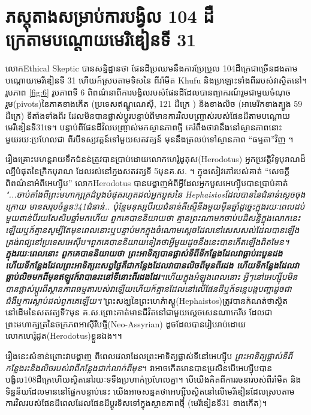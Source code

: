 \documentclass[10pt,twocolumn,letterpaper]{article}
\begin{document}
\section{ភស្តុតាងសម្រាប់ការបង្វិល 104 ដឺក្រេតាមបណ្តោយមេរិឌៀនទី 31}

លោកEthical Skeptic បានសន្និដ្ឋានថា ផែនដីប្រឈមនឹងការប្រែប្រួល 104ដឺក្រេជាច្រើនដង​តាមបណ្តោយមេរីឌៀនទី 31 ហើយក៍ស្របតាមទិសនៃ 
ពីរ៉ាមីត Khufu និងប្រឡោះទាំងពីររបស់វាស្ថិតនៅ។ រូបភាព \ref{fig:6} រូបភាពទី 6 ពិពណ៌នាពីការបង្វិលរបស់ផែនដីដែលបានព្យាករណ៍រួមជាមួយចំណុចរួម(pivots)នៃភាគខាងកើត (ប្រទេស​ឥណ្ឌូណេស៊ី, 121 ដឺក្រេ 
) និងខាងលិច (អាមេរិកខាងត្បូង 59 ដឺក្រេ)  ទីតាំងទាំងពីរ 
ដែលមិនបានផ្លាស់ប្តូរបន្ទាប់ពីមានការវិលបញ្ច្រាស់របស់ផែនដីតាមបណ្តោយមេរីឌៀនទី31ទេ។ បន្ទាប់ពីផែនដីវិលបញ្ច្រាស់មកស្ថានភាពថ្មី គេរំពឹងថាវានឹងនៅស្ថានភាពនោះមួយរយៈប្រហែលជា ពីរ​បីទស្សវត្តន៍ទៅមួយសតវត្សន៍ មុននឹងត្រលប់ទៅស្ថានភាព “ធម្មតា”វិញ \cite{150}។

រឿងគ្រោះមហន្តរាយទឹកជំនន់ត្រូវបានប្រាប់ដោយលោកហេរ៉ូដូតុស(Herodotus) អ្នកប្រវត្តិវិទូបុរាណដ៏ល្បីបំផុតនៃក្រិកបុរាណ ដែលរស់នៅក្នងសតវត្សទី 5​មុនគ.ស. \cite{31}។ ក្នុងសៀវភៅរបស់គាត់ “សេចក្តីពិពណ៌នាអំពីអេហ្ស៊ីប” លោកHerodotus បានបង្ហាញអំពីអ្វីដែលអ្នកបួសអេហ្ស៊ីបបានប្រាប់គាត់ \textit{"...ចាប់តាំងពីព្រះមហាក្សត្រដំបូងបំផុតរហូតដល់អ្នកបួសនៃ Hephaistosដែលបាននៃជំនាន់ស្តេចចុងក្រោយ មានសរុបចំនួន341ជំនាន់.. ប៉ុន្តែមនុស្សបីរយជំនាន់គឺស្មើនឹងមួយម៉ឺនឆ្នាំ​ដូច្នេះក្នុងរយៈពេលដប់មួយពាន់បីរយសែសិបឆ្នាំមកហើយ ពួកគេបាននិយាយថា គ្មានព្រះណាមកចាប់បដិសន្ធិក្នុងលោកនេះឡើយ​ឬក៍គ្មានសូម្បីតែមុនពេលនោះឬបន្ទាប់មកក្នុងចំណោមស្ដេចដែលនៅសេសសល់ដែលបានឡើងគ្រង់រាជ្យនៅប្រទេសអេស៊ីប។ពួកគេបាននិយាយទៀតថាអ្វីមួយដូចនឹងនេះបានកើតឡើងពិតមែន។\textbf{ក្នុងរយៈពេលនោះ ពួកគេបាននិយាយថា ព្រះអាទិត្យបានផ្លាស់ទីពីទីកន្លែងដែលវាធ្លាប់រះបួនដង ហើយទីកន្លែងដែលព្រះអាទិត្យរះសព្វថ្ងៃគឺជាកន្លែងដែលវាបានលិចពីមុនពីរដង ហើយទីកន្លែងដែលវាធ្លាប់លិចមកពីមុនឥឡូវក៍វាបានរះនៅទីនោះពីរដងដែរ}។​ហើយក្នុងអំឡុងពេលនោះ អ្វីៗនៅអេហ្ស៊ីបមិនបានផ្លាស់ប្ដូរពីស្ថានភាពធម្មតារបស់វាឡើយ​ហើយក៍គ្មានដែលនៅលើផែនដីឬក៍ទន្លេបង្កបញ្ហាដូចជាជំងឺឬការស្លាប់ដល់ពួកគេឡើយ។"}\cite{32}ព្រះសង្ឃនៃព្រះហេភ៉ាស្តូ(Hephaistos)ត្រូវបានកំណត់ថាស្ថិតនៅដើមនៃសតវត្សទី7មុន គ.ស.ព្រោះគាត់មានជីវិតនៅជាមួយស្តេចសេនណាកេរីប ដែលជាព្រះមហាក្សត្រនៃចក្រភពអាស៊ីរីបថ្មី(Neo-Assyrian) ដូចដែលបានរៀបរាប់ដោយលោកហេរ៉ូដូត(Herodotus)ខ្លួនឯង។\cite{32,33,34}។

រឿងនេះសំខាន់ព្រោះវាបង្ហាញ ពីពេលវេលាដែលព្រះអាទិត្យផ្លាស់ទីនៅអេហ្ស៊ីប \textit{ព្រះអាទិត្យផ្លាស់ទីពីកន្លែងរះនិងលិចរបស់វាពីកន្លែងជាក់លាក់ពីមុន}។ វាអាចកើតមានបានប្រសិនបើអេហ្ស៊ីបបានបង្វិល108ដឺក្រេហើយស្ថិតនៅរយៈទទឹងប្រហាក់ប្រហែលគ្នា។ បើយើងគិតពីការរចនារបស់ពីរ៉ាមីត និងទិន្នន័យដែលមាននៅផ្នែកបន្ទាប់នេះ យើងអាចសន្មតថាអេហ្ស៊ីបស្ថិតនៅលើមេរីឌៀនដែលស្របតាមការវិលរបស់ផែនដីពេលដែលផែនដីប្តូរទិសទៅក្នុងស្ថានភាពថ្មី (មេរីឌៀនទី​31 ខាងកើត)។
\end{document}
